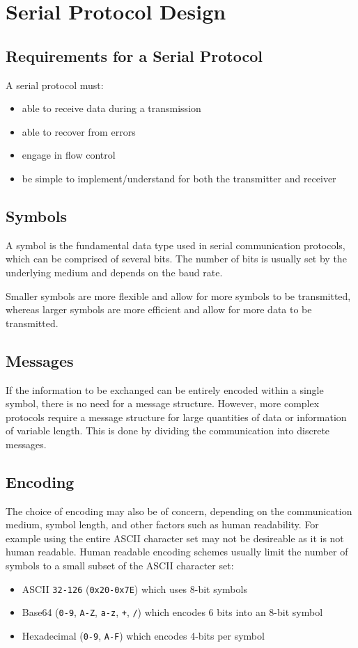 \documentclass[a4paper]{report}
\begin{document}
\section{Serial Protocol Design}
\subsection{Requirements for a Serial Protocol}
A serial protocol must:
\begin{itemize}
    \item able to receive data during a transmission
    \item able to recover from errors
    \item engage in flow control
    \item be simple to implement/understand for both the transmitter and receiver
\end{itemize}
\subsection{Symbols}
A symbol is the fundamental data type used in serial communication protocols,
which can be comprised of several bits. The number of bits is usually set by the
underlying medium and depends on the baud rate.

Smaller symbols are more flexible and allow for more symbols to be transmitted,
whereas larger symbols are more efficient and allow for more data to be transmitted.
\subsection{Messages}
If the information to be exchanged can be entirely encoded within a single symbol, there
is no need for a message structure. However, more complex protocols require a message structure
for large quantities of data or information of variable length. This is done by dividing the
communication into discrete messages.
\subsection{Encoding}
The choice of encoding may also be of concern, depending on the communication medium, symbol length,
and other factors such as human readability. For example using the entire ASCII character set
may not be desireable as it is not human readable. Human readable encoding schemes usually limit
the number of symbols to a small subset of the ASCII character set:
\begin{itemize}
    \item ASCII \texttt{32-126} (\texttt{0x20-0x7E}) which uses 8-bit symbols %
    \item Base64 (\texttt{0-9}, \texttt{A-Z}, \texttt{a-z}, \texttt{+}, \texttt{/}) which encodes 6 bits into an 8-bit symbol %
    \item Hexadecimal (\texttt{0-9}, \texttt{A-F}) which encodes 4-bits per symbol %
\end{itemize}
\end{document}
